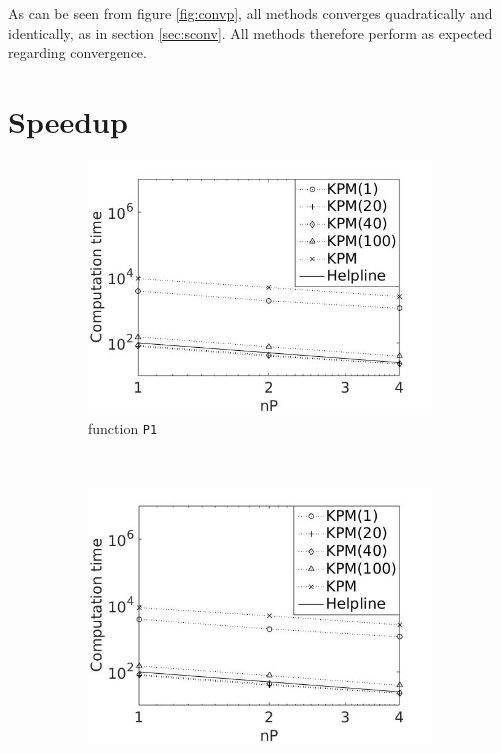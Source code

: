 As can be seen from figure \ref{fig:convp}, all methods converges quadratically and identically, as in section \ref{sec:sconv}. All methods therefore perform as expected regarding convergence.
\section{Speedup} \label{sec:speed}
\begin{figure}[H]
        \centering
        \begin{subfigure}[b]{0.45\textwidth}
                \includegraphics[width=\textwidth]{fig/u1para1}
                \caption{function \texttt{P1}}
                \label{fig:speed1}
        \end{subfigure}%
        ~
        \begin{subfigure}[b]{0.45\textwidth}
                \includegraphics[width=\textwidth]{fig/u2para2}

\end{subfigure}
\end{figure}
